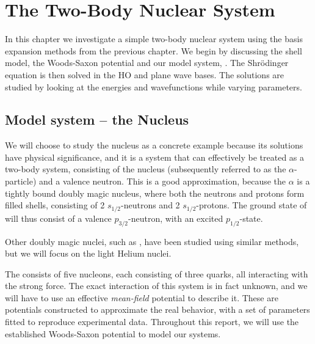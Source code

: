 \documentclass[../main/report.tex]{subfiles}
\begin{document}
  
\chapter{The Two-Body Nuclear System}
\label{cha:two-body}

In this chapter we investigate a simple two-body nuclear system using the basis expansion methods from the previous chapter.
We begin by discussing the shell model, the Woods-Saxon potential and our model system, . 
The Shrödinger equation is then solved in the HO and plane wave bases.
The solutions are studied by looking at the energies and wavefunctions while varying parameters.

\section{Model system -- the  Nucleus}
We will choose to study the  nucleus as a concrete
example because its solutions have physical significance, and it is a system that can effectively be treated as a two-body system, consisting of the  nucleus (subsequently referred to as the $\alpha$-particle) and a valence neutron. This is a good approximation, because the $\alpha$ is a tightly bound doubly magic nucleus, where both the neutrons and protons form filled shells, consisting of 2 $s_{1/2}$-neutrons and 2 $s_{1/2}$-protons. The ground state of  will thus consist of a valence $p_{3/2}$-neutron, with an excited $p_{1/2}$-state. 

Other doubly magic nuclei, such as , have been studied using similar methods\cite{gamow shell model 2008}, but we will focus on the light Helium nuclei.

The  consists of five nucleons, each consisting of three quarks, all interacting with the strong force. The exact interaction of this system is in fact unknown, and we will have to use an effective \emph{mean-field} potential to describe it. These are potentials constructed to approximate the real behavior, with a set of parameters fitted to reproduce experimental data. Throughout this report, we will use the established Woods-Saxon potential to model our systems.
 
\end{document}
